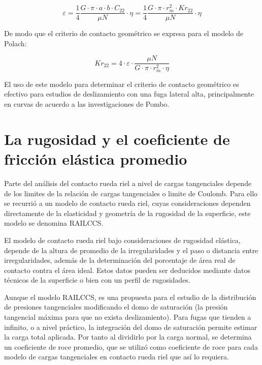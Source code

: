 \documentclass[main]{subfiles}
\begin{document}
\begin{equation}
\varepsilon=\frac{1}{4}\frac{
G \cdot \pi \cdot a \cdot b \cdot C_{22}
}{\mu N} \cdot \eta=\frac{1}{4}\frac{
G \cdot \pi \cdot r_m^2 \cdot Kr_{22}
}{\mu N} \cdot \eta
\end{equation}

De modo que el criterio de contacto geométrico se expresa para el modelo de Polach:

\begin{equation}
Kr_{22}=4 \cdot \varepsilon \cdot \frac{\mu N}{G \cdot \pi \cdot r_m^2 \cdot \eta}
\end{equation}

El uso de este modelo para determinar el criterio de contacto geométrico es efectivo para estudios de deslizamiento con una fuga lateral alta, principalmente en curvas de acuerdo a las investigaciones de Pombo.

\section{La rugosidad y el coeficiente de fricción elástica promedio}

Parte del análisis del contacto rueda riel a nivel de cargas tangenciales depende de los limites de la relación de cargas tangenciales o limite de Coulomb. Para ello se recurrió a un modelo de contacto rueda riel, cuyas consideraciones dependen directamente de la elasticidad y geometría de la rugosidad de la superficie, este modelo se denomina RAILCCS.

El modelo de contacto rueda riel bajo consideraciones de rugosidad elástica, depende de la altura de promedio de la irregularidades y el paso o distancia entre irregularidades, además de la determinación del porcentaje de área real de contacto contra el área ideal. Estos datos pueden ser deducidos mediante datos técnicos de la superficie o bien con un perfil de rugosidades.

Aunque el modelo RAILCCS, es una propuesta para el estudio de la distribución de presiones tangenciales modificando el domo de saturación (la presión tangencial máxima para que no exista deslizamiento). Para fugas que tienden a infinito, o a nivel práctico, la integración del domo de saturación permite estimar la carga total aplicada. Por tanto al dividirlo por la carga normal, se determina un coeficiente de roce promedio, que se utilizó como coeficiente de roce para cada modelo de cargas tangenciales en contacto rueda riel que así lo requiera.
\end{document}
